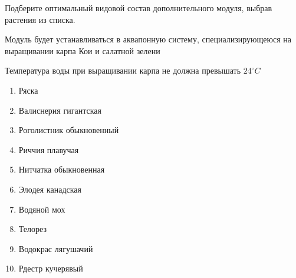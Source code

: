 
Подберите оптимальный видовой состав дополнительного модуля, выбрав растения из списка.

Модуль будет устанавливаться в аквапонную систему, специализирующеюся на выращивании карпа Кои и салатной зелени

Температура воды при выращивании карпа не должна превышать $24^{\circ}C$

\begin{enumerate}
    \item Ряска
    \item Валиснерия гигантская
    \item Роголистник обыкновенный
    \item Риччия плавучая
    \item Нитчатка обыкновенная
    \item Элодея канадская
    \item Водяной мох
    \item Телорез
    \item Водокрас лягушачий
    \item Рдестр кучерявый
\end{enumerate}
